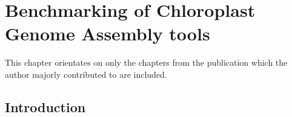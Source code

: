 


\chapter{Benchmarking of Chloroplast Genome Assembly tools } %

\label{Chapter1} %
This chapter orientates on \cite{freudenthal2019landscape} only the chapters from the publication which the author majorly contributed to are included. 


\newcommand{\keyword}[1]{\textbf{#1}}
\newcommand{\tabhead}[1]{\textbf{#1}}
\newcommand{\code}[1]{\texttt{#1}}
\newcommand{\file}[1]{\texttt{\bfseries#1}}
\newcommand{\option}[1]{\texttt{\itshape#1}}


\section{Introduction}

